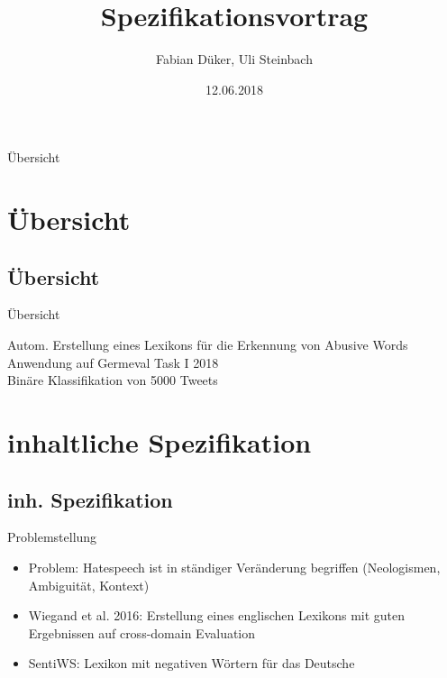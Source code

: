 \documentclass{beamer}
\begin{document}
\title[]{Spezifikationsvortrag}
\author[]{Fabian Düker, Uli Steinbach}
\date{12.06.2018}

\frame{\titlepage}
\begin{frame}[allowframebreaks]{Übersicht}
\tableofcontents
\end{frame}



\section{Übersicht}

\subsection[Übersicht]{Übersicht }

\begin{frame}{Übersicht}
\begin{block}{Autom. Erstellung eines Lexikons für die Erkennung von Abusive Words }
Anwendung auf Germeval Task I 2018 \\Binäre Klassifikation von 5000 Tweets 
\end{block}
\end{frame}


\section{inhaltliche Spezifikation}
\subsection[inh. Spez.]{ inh. Spezifikation }

\begin{frame}{Problemstellung}
\begin{itemize}
	\item Problem: Hatespeech ist in ständiger Veränderung begriffen (Neologismen, Ambiguität, Kontext)
	\item Wiegand et al. 2016: Erstellung eines englischen Lexikons mit guten Ergebnissen auf cross-domain Evaluation
	\item SentiWS: Lexikon mit negativen Wörtern für das Deutsche

\end{itemize}
\end{frame}
\end{document}
